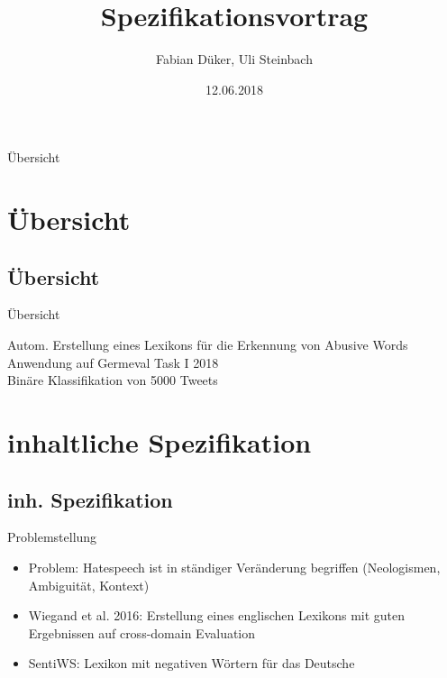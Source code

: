 \documentclass{beamer}
\begin{document}
\title[]{Spezifikationsvortrag}
\author[]{Fabian Düker, Uli Steinbach}
\date{12.06.2018}

\frame{\titlepage}
\begin{frame}[allowframebreaks]{Übersicht}
\tableofcontents
\end{frame}



\section{Übersicht}

\subsection[Übersicht]{Übersicht }

\begin{frame}{Übersicht}
\begin{block}{Autom. Erstellung eines Lexikons für die Erkennung von Abusive Words }
Anwendung auf Germeval Task I 2018 \\Binäre Klassifikation von 5000 Tweets 
\end{block}
\end{frame}


\section{inhaltliche Spezifikation}
\subsection[inh. Spez.]{ inh. Spezifikation }

\begin{frame}{Problemstellung}
\begin{itemize}
	\item Problem: Hatespeech ist in ständiger Veränderung begriffen (Neologismen, Ambiguität, Kontext)
	\item Wiegand et al. 2016: Erstellung eines englischen Lexikons mit guten Ergebnissen auf cross-domain Evaluation
	\item SentiWS: Lexikon mit negativen Wörtern für das Deutsche

\end{itemize}
\end{frame}
\end{document}
